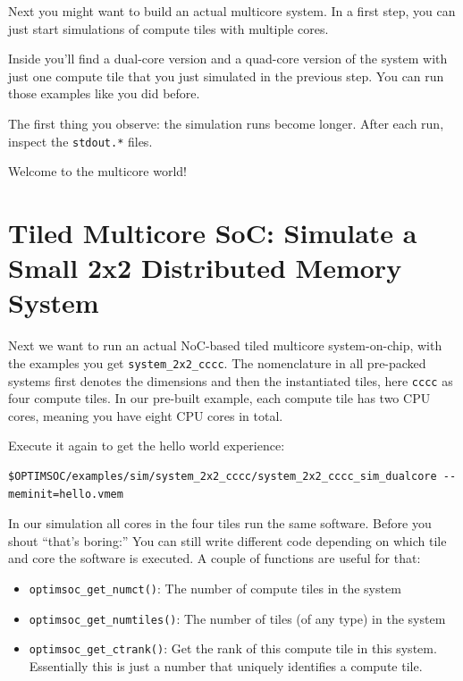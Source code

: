 Next you might want to build an actual multicore system. In a first
step, you can just start simulations of compute tiles with multiple
cores.

Inside  you'll find a dual-core version and a quad-core version of the system with just one compute tile that you just simulated in the previous step.
You can run those examples like you did before.

The first thing you observe: the simulation runs become longer.
After each run, inspect the \verb|stdout.*| files.

Welcome to the multicore world!

\section{Tiled Multicore SoC: Simulate a Small 2x2 Distributed Memory
  System}

Next we want to run an actual NoC-based tiled multicore system-on-chip,
with the examples you get \verb|system_2x2_cccc|. The nomenclature in
all pre-packed systems first denotes the dimensions and then the
instantiated tiles, here \verb|cccc| as four compute tiles.
In our pre-built example, each compute tile has two CPU cores, meaning you have eight CPU cores in total.

Execute it again to get the hello world experience:

\begin{lstlisting}
$OPTIMSOC/examples/sim/system_2x2_cccc/system_2x2_cccc_sim_dualcore --meminit=hello.vmem
\end{lstlisting}

In our simulation all cores in the four tiles run the same
software. Before you shout ``that's boring:'' You can still write
different code depending on which tile and core the software is
executed. A couple of functions are useful for that:

\begin{itemize}
  \item \verb|optimsoc_get_numct()|: The number of compute tiles in the system
  \item \verb|optimsoc_get_numtiles()|: The number of tiles (of any type) in
    the system
  \item \verb|optimsoc_get_ctrank()|: Get the rank of this compute tile in this
    system. Essentially this is just a number that uniquely identifies a
    compute tile.
\end{itemize}

